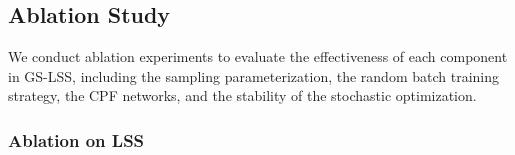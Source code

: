 \documentclass[lettersize,journal]{IEEEtran}
\begin{document}



\subsection{Ablation Study}

We conduct ablation experiments to evaluate the effectiveness of each component in GS-LSS, including the sampling parameterization, 
the random batch training strategy,
the CPF networks, and the stability of the stochastic optimization.

\subsubsection{Ablation on LSS}
\end{document}
